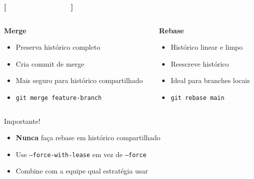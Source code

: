 \documentclass[10pt, brazil]{beamer}
\begin{document}
\begin{frame}{\textcolor{lightpurple}{\textbf{[}} \textbf{\textcolor{white}{Merge vs Rebase}} \textcolor{lightpurple}{\textbf{]}}}
  
  \begin{columns}
    \begin{column}{0.5\textwidth}
      \textbf{Merge}
      \begin{itemize}
        \item Preserva histórico completo
        \item Cria commit de merge
        \item Mais seguro para histórico compartilhado
        \item \texttt{git merge feature-branch}
      \end{itemize}
    \end{column}
    \begin{column}{0.5\textwidth}
      \textbf{Rebase}
      \begin{itemize}
        \item Histórico linear e limpo
        \item Reescreve histórico
        \item Ideal para branches locais
        \item \texttt{git rebase main}
      \end{itemize}
    \end{column}
  \end{columns}

  \vspace{1em}

  \begin{alertblock}{Importante!}
    \begin{itemize}
      \item \textbf{Nunca} faça rebase em histórico compartilhado
      \item Use \texttt{--force-with-lease} em vez de \texttt{--force}
      \item Combine com a equipe qual estratégia usar
    \end{itemize}
  \end{alertblock}

\end{frame}
\end{document}
